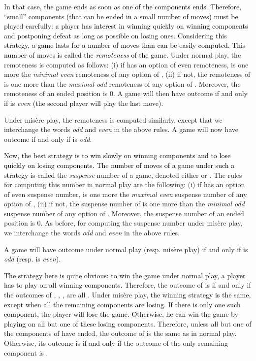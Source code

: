 \documentclass[11pt]{article}
\newcommand{\modif}[1]{\textcolor{black}{#1}}
\begin{document}
\modif{
In that case, the game ends as soon as one of the components ends.
Therefore, ``small'' components (that can be ended in a small
number of moves) must be played carefully:
a player has interest in winning quickly on winning components
and postponing defeat as long as possible on losing ones.
Considering this strategy, a game lasts
for a number of moves than can be easily computed. This number
of moves is called the {\em remoteness} of the game.
}
Under normal play, the remoteness  is computed as follows:
(i) if  has an option of even remoteness,  is one more the
{\em minimal even} remoteness of any option of ,
(ii) if not, the remoteness of  is one more than the {\em maximal odd}
remoteness of any option of . Moreover, the remoteness of an
ended position is 0. A game  will then have outcome  if and
only if  is {\em even}
\modif{(the second player will play the last move)}.

Under mis\`ere play, the remoteness  is computed
similarly, except that we interchange the words {\em odd} and {\em even}
in the above rules. A game  will now have outcome  if and
only if  is {\em odd}.

\vskip 4mm

\modif{
Now, the best strategy is to win slowly on winning components
and to lose quickly on losing components. The number of moves
of a game under such a strategy is called}
the {\em suspense} number of a game, denoted either
 or . The rules for computing this number in normal
play are the following:
(i) if  has an option of even suspense number,  is one more the
{\em maximal even} suspense number of any option of ,
(ii) if not, the suspense number of  is one more than the {\em minimal odd}
suspense number of any option of . Moreover, the suspense number of an
ended position is 0. 
As before, for computing the suspense number under mis\`ere play,
we interchange the words {\em odd} and {\em even}
in the above rules.

A game  will have outcome  under normal play (resp. mis\`ere play)
if and
only if  is {\em odd} (resp.  is {\em even}).

\vskip 4mm

\modif{
The strategy here is quite obvious: to win the game
under normal play, a player
has to play on all winning components. Therefore,}
the outcome of  is  if and only if the
outcomes of , , ,  are all .
Under mis\`ere play, 
\modif{the winning strategy is the same, except when
all the remaining components are losing. If there is only one
such component, the player will lose the game. Otherwise, he can
win the game by playing on all but one of these losing components.
Therefore,}
unless all but one of the components of  have ended,
the outcome of  is the same as in normal play. Otherwise,
its outcome is  if and only if the outcome of the only
remaining component is .
\end{document}
